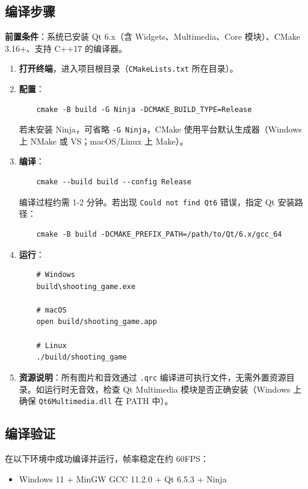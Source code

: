 \documentclass[utf8]{ctexart}
\begin{document}
\subsection{编译步骤}

\textbf{前置条件}：系统已安装 Qt 6.x（含 Widgets、Multimedia、Core 模块）、CMake 3.16+、支持 C++17 的编译器。

\begin{enumerate}
  \item \textbf{打开终端}，进入项目根目录（\texttt{CMakeLists.txt} 所在目录）。
  \item \textbf{配置}：
    \begin{verbatim}
    cmake -B build -G Ninja -DCMAKE_BUILD_TYPE=Release
    \end{verbatim}
    若未安装 Ninja，可省略 \texttt{-G Ninja}，CMake 使用平台默认生成器（Windows 上 NMake 或 VS；macOS/Linux 上 Make）。
  \item \textbf{编译}：
    \begin{verbatim}
    cmake --build build --config Release
    \end{verbatim}
    编译过程约需 1-2 分钟。若出现 \texttt{Could not find Qt6} 错误，指定 Qt 安装路径：
    \begin{verbatim}
    cmake -B build -DCMAKE_PREFIX_PATH=/path/to/Qt/6.x/gcc_64
    \end{verbatim}
  \item \textbf{运行}：
    \begin{verbatim}
    # Windows
    build\shooting_game.exe

    # macOS
    open build/shooting_game.app

    # Linux
    ./build/shooting_game
    \end{verbatim}
  \item \textbf{资源说明}：所有图片和音效通过 \texttt{.qrc} 编译进可执行文件，无需外置资源目录。如运行时无音效，检查 Qt Multimedia 模块是否正确安装（Windows 上确保 \texttt{Qt6Multimedia.dll} 在 PATH 中）。
\end{enumerate}

\subsection{编译验证}

在以下环境中成功编译并运行，帧率稳定在约 60FPS：

\begin{itemize}
  \item Windows 11 + MinGW GCC 11.2.0 + Qt 6.5.3 + Ninja
\end{itemize}
\end{document}
